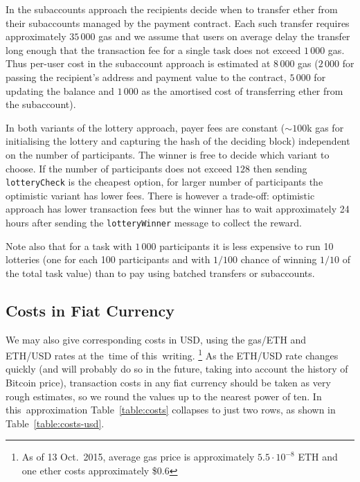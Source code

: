 \documentclass[a4paper]{article}
\newcommand{\ETH}{ETH}%
\begin{document}
    In the subaccounts approach the recipients decide when to transfer
    ether from their subaccounts managed by the payment contract. Each
    such transfer requires approximately $35\,000$ gas and we assume that
    users on average delay the transfer long enough that the transaction
    fee for a single task does not exceed $1\,000$ gas. Thus per-user cost
    in the subaccount approach is estimated at $8\,000$ gas ($2\,000$ for passing
    the recipient's address and payment value to the contract, $5\,000$ for
    updating the balance and $1\,000$ as the amortised cost of transferring ether
    from the subaccount).

    In both variants of the lottery approach, payer fees are constant
    ($\sim 100$k gas for initialising the lottery and capturing the
    hash of the deciding block) independent on the number of
    participants. The winner is free to decide which variant to choose.
    If the number of participants does not exceed $128$ then sending \verb!lotteryCheck!
    is the cheapest option, for larger number of participants the optimistic
    variant has lower fees. There is however a trade-off: optimistic approach has
    lower transaction fees but the winner has to wait approximately 24 hours after
    sending the \verb!lotteryWinner! message to collect the reward. 

    Note also that for a task with $1\,000$ participants it is less
    expensive to run 10 lotteries (one for each 100 participants and
    with $1 / 100$ chance of winning $1 / 10$ of the total task value)
    than to pay using batched transfers or subaccounts.
    
    \subsection{Costs in Fiat Currency}
    We may also give corresponding costs in USD, using the
    gas/\ETH{} and \ETH{}/USD rates at the~time of this~writing.%
    \footnote{As of 13 Oct.\ 2015, average
      gas price is approximately $5.5 \cdot 10^{-8}$ \ETH{} and one
      ether costs approximately \$0.6}%
    As the \ETH{}/USD rate changes quickly (and will probably do so in
    the future, taking into account the history of Bitcoin price),
    transaction costs in any fiat currency should be taken as very
    rough estimates, so we round the values up to the nearest power of ten.
    In this~approximation Table~\ref{table:costs} collapses to just two rows,
    as shown in Table~\ref{table:costs-usd}.
       
\end{document}
